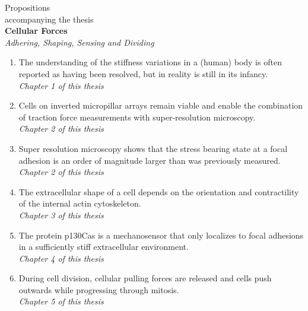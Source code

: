 \documentclass[11pt]{article}
\begin{document}
\pagestyle{empty}
\begin{center}
{\Huge Propositions}\\[1cm]
{\Large accompanying the thesis}\\[0.5cm]
{\Large \textbf{Cellular Forces}} \\
{\Large \emph{Adhering, Shaping, Sensing and Dividing}}\\[1cm]
\begin{enumerate}
 \setlength{\itemsep}{10pt}
  \item The understanding of the stiffness variations in a (human) body is often reported as 
		having been resolved, but in reality is still in its infancy. \\
  \hfill \emph{Chapter 1 of this thesis}\\
  \item Cells on inverted micropillar arrays remain viable and enable the combination of traction force 
		measurements with super-resolution microscopy.\\
  \hfill  \emph{Chapter 2 of this thesis}\\
  \item Super resolution microscopy shows that the stress bearing state at a focal adhesion is an 
		order of magnitude larger than was previously measured. \\
  \hfill  \emph{Chapter 2 of this thesis}\\
  \item The extracellular shape of a cell depends on the orientation and contractility of the internal 
		actin cytoskeleton.\\
  \hfill  \emph{Chapter 3 of this thesis}\\
  \item The protein p130Cas is a mechanosensor that only localizes to focal adhesions in a 
		sufficiently stiff extracellular environment.\\
  \hfill  \emph{Chapter 4 of this thesis}\\
  \item During cell division, cellular pulling forces are released and cells push outwards while 
		progressing through mitosis.\\
  \hfill  \emph{Chapter 5 of this thesis}\\ 


\end{enumerate}
\end{center}
\end{document}

